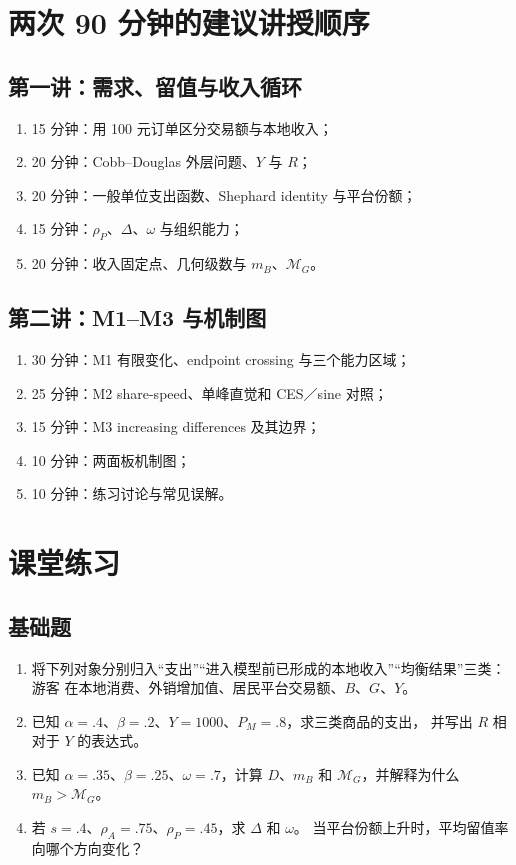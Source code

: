 \documentclass[UTF8,11pt,scheme=chinese,fontset=windows]{ctexart}
\newcommand{\MG}{\mathcal M_G}
\theoremstyle{definition}
\begin{document}
\section{两次 90 分钟的建议讲授顺序}

\subsection*{第一讲：需求、留值与收入循环}
\begin{enumerate}
  \item 15 分钟：用 100 元订单区分交易额与本地收入；
  \item 20 分钟：Cobb--Douglas 外层问题、\(Y\) 与 \(R\)；
  \item 20 分钟：一般单位支出函数、Shephard identity 与平台份额；
  \item 15 分钟：\(\rho_P\)、\(\Delta\)、\(\omega\) 与组织能力；
  \item 20 分钟：收入固定点、几何级数与 \(m_B\)、\(\MG\)。
\end{enumerate}

\subsection*{第二讲：M1--M3 与机制图}
\begin{enumerate}
  \item 30 分钟：M1 有限变化、endpoint crossing 与三个能力区域；
  \item 25 分钟：M2 share-speed、单峰直觉和 CES／sine 对照；
  \item 15 分钟：M3 increasing differences 及其边界；
  \item 10 分钟：两面板机制图；
  \item 10 分钟：练习讨论与常见误解。
\end{enumerate}

\section{课堂练习}

\subsection{基础题}
\begin{enumerate}
  \item 将下列对象分别归入“支出”“进入模型前已形成的本地收入”“均衡结果”三类：游客
  在本地消费、外销增加值、居民平台交易额、\(B\)、\(G\)、\(Y\)。

  \item 已知 \(\alpha=.4\)、\(\beta=.2\)、\(Y=1000\)、\(P_M=.8\)，求三类商品的支出，
  并写出 \(R\) 相对于 \(Y\) 的表达式。

  \item 已知 \(\alpha=.35\)、\(\beta=.25\)、\(\omega=.7\)，计算 \(D\)、\(m_B\) 和
  \(\MG\)，并解释为什么 \(m_B>\MG\)。

  \item 若 \(s=.4\)、\(\rho_A=.75\)、\(\rho_P=.45\)，求 \(\Delta\) 和 \(\omega\)。
  当平台份额上升时，平均留值率向哪个方向变化？
\end{enumerate}
\end{document}
